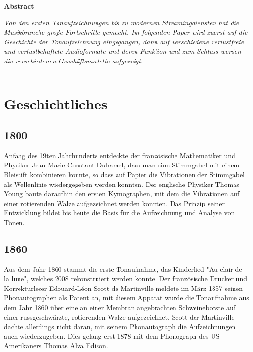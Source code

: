 \documentclass{extarticle}
\begin{document}
	
	
		\singlespacing
		\begin{center}
			\large\textbf{Abstract}	\\
		\end{center}
		\textit{Von den ersten Tonaufzeichnungen bis zu modernen Streamingdiensten hat die Musikbranche große Fortschritte gemacht. Im folgenden Paper wird zuerst auf die Geschichte der Tonaufzeichnung eingegangen, dann auf verschiedene verlustfreie und verlustbehaftete Audioformate und deren Funktion und zum Schluss werden die verschiedenen Geschäftsmodelle aufgezeigt.} \\~\\
		
		\section{Geschichtliches}
		\subsection{1800}
		Anfang des 19ten Jahrhunderts entdeckte der französische Mathematiker und Physiker Jean Marie Constant Duhamel, dass man eine Stimmgabel mit einem Bleistift kombinieren konnte, so dass auf Papier die Vibrationen der Stimmgabel als Wellenlinie wiedergegeben werden konnten. Der englische Physiker Thomas Young baute daraufhin den ersten Kymographen, mit dem die Vibrationen auf einer rotierenden Walze aufgezeichnet werden konnten. Das Prinzip seiner Entwicklung bildet bis heute die Basis für die Aufzeichnung und Analyse von Tönen. \cite{Disc1}
		
		\subsection{1860}
		Aus dem Jahr 1860 stammt die erste Tonaufnahme, das Kinderlied "Au clair de la lune", welches 2008 rekonstruiert werden konnte. Der französische Drucker und Korrekturleser Edouard-Léon Scott de Martinville meldete im März 1857 seinen Phonautographen als Patent an, mit diesem Apparat wurde die Tonaufnahme aus dem Jahr 1860 über eine an einer Membran angebrachten Schweineborste auf einer russgeschwärzte, rotierenden Walze aufgezeichnet. Scott der Martinville dachte allerdings nicht daran, mit seinem Phonautograph die Aufzeichnungen auch wiederzugeben. Dies gelang erst 1878 mit dem Phonograph des US-Amerikaners Thomas Alva Edison. \cite{Disc2}
		
\end{document}
